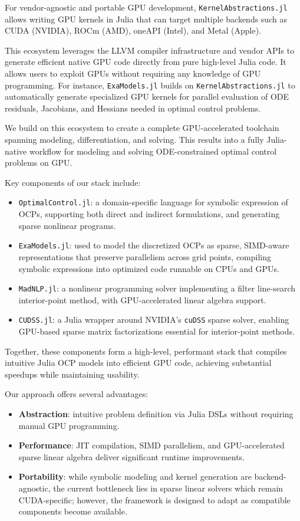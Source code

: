 For vendor-agnostic and portable GPU development, \texttt{KernelAbstractions.jl}~\cite{Churavy_KernelAbstractions_jl} allows writing GPU kernels in Julia that can target multiple backends such as CUDA (NVIDIA), ROCm (AMD), oneAPI (Intel), and Metal (Apple).

This ecosystem leverages the LLVM compiler infrastructure and vendor APIs to generate efficient native GPU code directly from pure high-level Julia code.
It allows users to exploit GPUs without requiring any knowledge of GPU programming.
For instance, \texttt{ExaModels.jl} builds on \texttt{KernelAbstractions.jl} to automatically generate specialized GPU kernels for parallel evaluation of ODE residuals, Jacobians, and Hessians needed in optimal control problems.

We build on this ecosystem to create a complete GPU-accelerated toolchain spanning modeling, differentiation, and solving.
This results into a fully Julia-native workflow for modeling and solving ODE-constrained optimal control problems on GPU.

Key components of our stack include:

\begin{itemize}
    \item \texttt{OptimalControl.jl}: a domain-specific language for symbolic expression of OCPs, supporting both direct and indirect formulations, and generating sparse nonlinear programs.
    \item \texttt{ExaModels.jl}: used to model the discretized OCPs as sparse, 
    SIMD-aware representations that preserve parallelism across grid points, compiling symbolic expressions into optimized code runnable on CPUs and GPUs.
    \item \texttt{MadNLP.jl}: a nonlinear programming solver implementing a filter line-search interior-point method, with GPU-accelerated linear algebra support.
    \item \texttt{CUDSS.jl}: a Julia wrapper around NVIDIA’s \texttt{cuDSS} sparse solver, enabling GPU-based sparse matrix factorizations essential for interior-point methods.
\end{itemize}

Together, these components form a high-level, performant stack that compiles intuitive Julia OCP models into efficient GPU code, achieving substantial speedups while maintaining usability.

Our approach offers several advantages:
\begin{itemize}
    \item \textbf{Abstraction}: intuitive problem definition via Julia DSLs without requiring manual GPU programming.
    \item \textbf{Performance}: JIT compilation, SIMD parallelism, and GPU-accelerated sparse linear algebra deliver significant runtime improvements.
    \item \textbf{Portability}: while symbolic modeling and kernel generation are backend-agnostic, the current bottleneck lies in sparse linear solvers which remain CUDA-specific; however, the framework is designed to adapt as compatible components become available.
\end{itemize}

